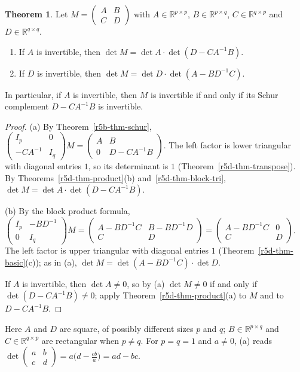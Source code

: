 \documentclass[12pt]{article}
\newcommand{\R}{\mathbb R}
\theoremstyle{definition}
\newtheorem{theorem}{Theorem}
\begin{document}
\begin{theorem}\label{r5d-thm-schur-det}
Let \(M=\begin{pmatrix}A&B\\C&D\end{pmatrix}\) with \(A\in\R^{p\times p}\), \(B\in\R^{p\times q}\),
\(C\in\R^{q\times p}\) and \(D\in\R^{q\times q}\).
\begin{enumerate}
\item If \(A\) is invertible, then \(\det M=\det A\cdot\det(D-CA^{-1}B)\).
\item If \(D\) is invertible, then \(\det M=\det D\cdot\det(A-BD^{-1}C)\).
\end{enumerate}
In particular, if \(A\) is invertible, then \(M\) is invertible if and only if its Schur complement
\(D-CA^{-1}B\) is invertible.
\end{theorem}
\begin{proof}
(a) By Theorem~\ref{r5b-thm-schur},
\(\left(\begin{smallmatrix}I_p&0\\-CA^{-1}&I_q\end{smallmatrix}\right)M
=\left(\begin{smallmatrix}A&B\\0&D-CA^{-1}B\end{smallmatrix}\right)\). The left factor is lower
triangular with diagonal entries \(1\), so its determinant is \(1\) (Theorem~\ref{r5d-thm-transpose}). By
Theorems~\ref{r5d-thm-product}(b) and~\ref{r5d-thm-block-tri},
\(\det M=\det A\cdot\det(D-CA^{-1}B)\).

(b) By the block product formula,
\(\left(\begin{smallmatrix}I_p&-BD^{-1}\\0&I_q\end{smallmatrix}\right)M
=\left(\begin{smallmatrix}A-BD^{-1}C&B-BD^{-1}D\\C&D\end{smallmatrix}\right)
=\left(\begin{smallmatrix}A-BD^{-1}C&0\\C&D\end{smallmatrix}\right)\). The left factor is upper
triangular with diagonal entries \(1\) (Theorem~\ref{r5d-thm-basic}(c)); as in (a), \(\det M=\det(A-BD^{-1}C)\cdot\det D\).

If \(A\) is invertible, then \(\det A\ne0\), so by (a) \(\det M\ne0\) if and only if
\(\det(D-CA^{-1}B)\ne0\); apply Theorem~\ref{r5d-thm-product}(a) to \(M\) and to \(D-CA^{-1}B\).
\end{proof}
Here \(A\) and \(D\) are square, of possibly different sizes \(p\) and \(q\);
\(B\in\R^{p\times q}\) and \(C\in\R^{q\times p}\) are rectangular when \(p\ne q\). For \(p=q=1\) and
\(a\ne0\), (a) reads
\(\det\left(\begin{smallmatrix}a&b\\c&d\end{smallmatrix}\right)=a\bigl(d-\frac{cb}a\bigr)=ad-bc\).
\end{document}
